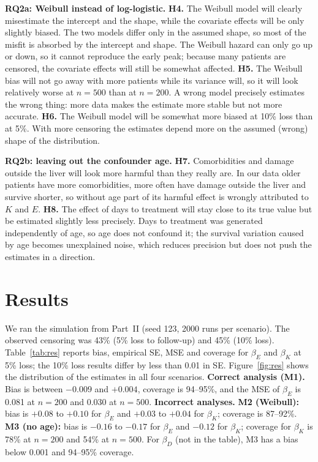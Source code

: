 \documentclass[10pt,a4paper]{article}
\begin{document}
\textbf{RQ2a: Weibull instead of log-logistic.}
\textbf{H4.} The Weibull model will clearly misestimate the intercept and the shape, while the covariate effects will be only slightly biased. The two models differ only in the assumed shape, so most of the misfit is absorbed by the intercept and shape. The Weibull hazard can only go up or down, so it cannot reproduce the early peak; because many patients are censored, the covariate effects will still be somewhat affected.
\textbf{H5.} The Weibull bias will not go away with more patients while its variance will, so it will look relatively worse at $n=500$ than at $n=200$. A wrong model precisely estimates the wrong thing: more data makes the estimate more stable but not more accurate.
\textbf{H6.} The Weibull model will be somewhat more biased at 10\% loss than at 5\%. With more censoring the estimates depend more on the assumed (wrong) shape of the distribution.

\textbf{RQ2b: leaving out the confounder age.}
\textbf{H7.} Comorbidities and damage outside the liver will look more harmful than they really are. In our data older patients have more comorbidities, more often have damage outside the liver and survive shorter, so without age part of its harmful effect is wrongly attributed to $K$ and $E$.
\textbf{H8.} The effect of days to treatment will stay close to its true value but be estimated slightly less precisely. Days to treatment was generated independently of age, so age does not confound it; the survival variation caused by age becomes unexplained noise, which reduces precision but does not push the estimates in a direction.

\newpage
\section{Results}
We ran the simulation from Part~II (seed 123, 2000 runs per scenario). The observed censoring was 43\% (5\% loss to follow-up) and 45\% (10\% loss). Table~\ref{tab:res} reports bias, empirical SE, MSE and coverage for $\beta_E$ and $\beta_K$ at 5\% loss; the 10\% loss results differ by less than 0.01 in SE. Figure~\ref{fig:res} shows the distribution of the estimates in all four scenarios.
\textbf{Correct analysis (M1).} Bias is between $-0.009$ and $+0.004$, coverage is 94--95\%, and the MSE of $\beta_E$ is 0.081 at $n=200$ and 0.030 at $n=500$.
\textbf{Incorrect analyses.} \textbf{M2 (Weibull):} bias is $+0.08$ to $+0.10$ for $\beta_E$ and $+0.03$ to $+0.04$ for $\beta_K$; coverage is 87--92\%. \textbf{M3 (no age):} bias is $-0.16$ to $-0.17$ for $\beta_E$ and $-0.12$ for $\beta_K$; coverage for $\beta_K$ is 78\% at $n=200$ and 54\% at $n=500$. For $\beta_D$ (not in the table), M3 has a bias below 0.001 and 94--95\% coverage.
\end{document}
